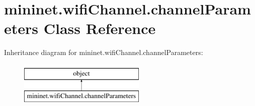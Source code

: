 \hypertarget{classmininet_1_1wifiChannel_1_1channelParameters}{\section{mininet.\-wifi\-Channel.\-channel\-Parameters Class Reference}
\label{classmininet_1_1wifiChannel_1_1channelParameters}
}
Inheritance diagram for mininet.\-wifi\-Channel.\-channel\-Parameters\-:\begin{figure}[H]
\begin{center}
\leavevmode
\includegraphics[height=2.000000cm]{classmininet_1_1wifiChannel_1_1channelParameters}
\end{center}
\end{figure}
